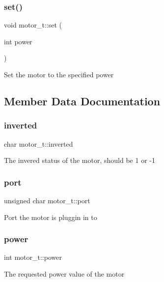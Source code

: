 \subsubsection{\texorpdfstring{set()}{set()}}
{\footnotesize\ttfamily void motor\+\_\+t\+::set (\begin{DoxyParamCaption}\item[{int}]{power }\end{DoxyParamCaption})}

Set the motor to the specified power 

\subsection{Member Data Documentation}
\mbox{\label{structmotor__t_a151da94c1625feddc6dd621d7a97f64b}} 
\subsubsection{\texorpdfstring{inverted}{inverted}}
{\footnotesize\ttfamily char motor\+\_\+t\+::inverted}

The invered status of the motor, should be 1 or -\/1 \mbox{\label{structmotor__t_a5b2cb1644501c09be84743b375fd2071}} 
\subsubsection{\texorpdfstring{port}{port}}
{\footnotesize\ttfamily unsigned char motor\+\_\+t\+::port}

Port the motor is pluggin in to \mbox{\label{structmotor__t_a7e84d55b013193d736b66bc4d213e98f}} 
\subsubsection{\texorpdfstring{power}{power}}
{\footnotesize\ttfamily int motor\+\_\+t\+::power}

The requested power value of the motor \mbox{\label{structmotor__t_a313fd4008216d0d01b20dcf14ee83fb6}} 
